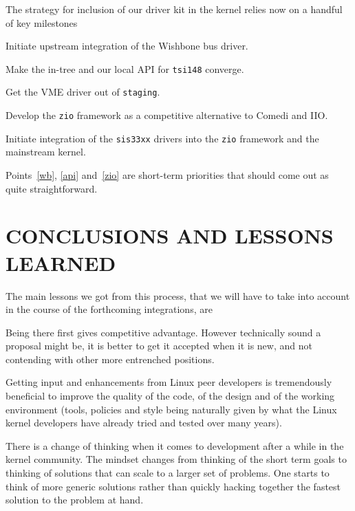 \documentclass{JAC2003}
\begin{document}
The strategy for inclusion of our driver kit in the kernel relies now on a
handful of key milestones
\begin{Enumerate}
\item Initiate upstream integration of the Wishbone bus driver.
	\label{wb}
\item Make the in-tree and our local API for \verb|tsi148| converge.
	\label{api}
\item Get the VME driver out of \texttt{staging}.
\item Develop the \texttt{zio} framework as a competitive alternative
	to Comedi and IIO.
	\label{zio}
\item Initiate integration of the \texttt{sis33xx} drivers into the
    \texttt{zio} framework and the mainstream kernel.
\end{Enumerate}
Points~\ref{wb}, \ref{api} and~\ref{zio} are short-term priorities that
should come out as quite straightforward.

\section{CONCLUSIONS AND LESSONS LEARNED}

The main lessons we got from this process, that we will have to take into
account in the course of the forthcoming integrations, are
\begin{Itemize}
\item Being there first gives competitive advantage. However technically
sound a proposal might be, it is better to get it accepted when it is
new, and not contending with other more entrenched positions.
\item Getting input and enhancements from Linux peer developers
is tremendously beneficial to improve the quality of the code, of the
design and of the working environment (tools, policies and style being
naturally given by what the Linux kernel developers have already tried
and tested over many years).
\item
    There is a change of thinking when it comes to development after
    a while in the kernel community. The mindset changes from
    thinking of the short term goals to thinking of solutions that
    can scale to a larger set of problems. One starts to think of
    more generic solutions rather than quickly hacking together
    the fastest solution to the problem at hand.

\end{Itemize}
\end{document}
